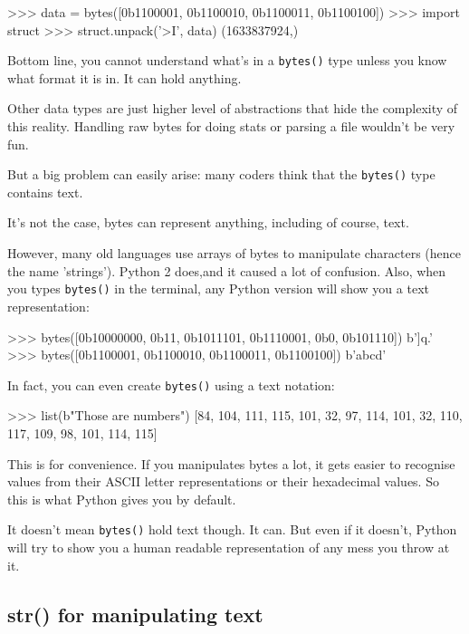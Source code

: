 \begin{py2and3}
>>> data = bytes([0b1100001, 0b1100010, 0b1100011, 0b1100100])
>>> import struct
>>> struct.unpack('>I', data)
(1633837924,)
\end{py2and3}

Bottom line, you cannot understand what's in a \lstinline{bytes()} type unless you know what format it is in. It can hold anything.

Other data types are just higher level of abstractions that hide the complexity of this reality. Handling raw bytes for doing stats or parsing a file wouldn't be very fun.

But a big problem can easily arise: many coders think that the \lstinline{bytes()} type contains text.

It's not the case, bytes can represent anything, including of course, text.

However, many old languages use arrays of bytes to manipulate characters (hence the name 'strings'). Python 2 does,and it caused a lot of confusion. Also, when you types \lstinline{bytes()} in the terminal, any Python version will  show you a text representation:


\begin{py2and3}
>>> bytes([0b10000000, 0b11, 0b1011101, 0b1110001, 0b0, 0b101110])
b']q.'
>>> bytes([0b1100001, 0b1100010, 0b1100011, 0b1100100])
b'abcd'
\end{py2and3}

In fact, you can even create \lstinline{bytes()} using a text notation:

\begin{py2and3}
>>> list(b"Those are numbers")
[84, 104, 111, 115, 101, 32, 97, 114, 101, 32, 110, 117, 109, 98, 101, 114, 115]
\end{py2and3}

This is for convenience. If you manipulates bytes a lot, it gets easier to recognise values from their ASCII letter representations or their hexadecimal values. So this is what Python gives you by default.

It doesn't mean \lstinline{bytes()} hold text though. It can. But even if it doesn't, Python will try to show you a human readable representation of any mess you throw at it.

\subsection{str() for manipulating text}

